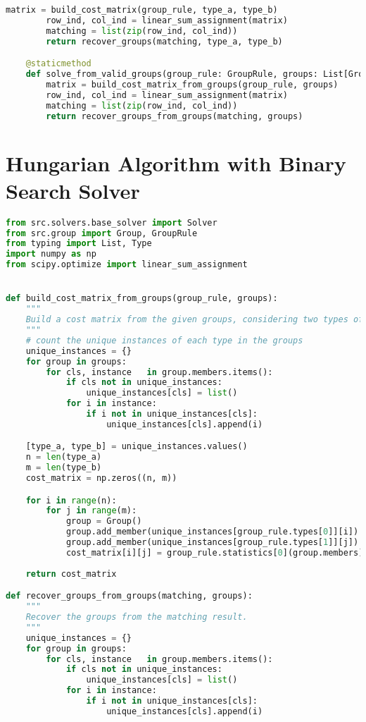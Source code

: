 \begin{apendicesenv}
\begin{lstlisting}[language=Python, caption={Hungarian Algorithm Solver Source Code}]
        matrix = build_cost_matrix(group_rule, type_a, type_b)
        row_ind, col_ind = linear_sum_assignment(matrix)
        matching = list(zip(row_ind, col_ind))
        return recover_groups(matching, type_a, type_b)

    @staticmethod
    def solve_from_valid_groups(group_rule: GroupRule, groups: List[Group]):
        matrix = build_cost_matrix_from_groups(group_rule, groups)
        row_ind, col_ind = linear_sum_assignment(matrix)
        matching = list(zip(row_ind, col_ind))
        return recover_groups_from_groups(matching, groups)
\end{lstlisting}

\chapter{Hungarian Algorithm with Binary Search Solver}
\label{app:solver_binary_search}
\begin{lstlisting}[language=Python, caption={Hungarian Algorithm with Binary Search Solver Source Code}]
from src.solvers.base_solver import Solver
from src.group import Group, GroupRule
from typing import List, Type
import numpy as np
from scipy.optimize import linear_sum_assignment


def build_cost_matrix_from_groups(group_rule, groups):
    """
    Build a cost matrix from the given groups, considering two types of objects.
    """
    # count the unique instances of each type in the groups
    unique_instances = {}
    for group in groups:
        for cls, instance   in group.members.items():
            if cls not in unique_instances:
                unique_instances[cls] = list()
            for i in instance:
                if i not in unique_instances[cls]:
                    unique_instances[cls].append(i)

    [type_a, type_b] = unique_instances.values()
    n = len(type_a)
    m = len(type_b)
    cost_matrix = np.zeros((n, m))

    for i in range(n):
        for j in range(m):
            group = Group()
            group.add_member(unique_instances[group_rule.types[0]][i])
            group.add_member(unique_instances[group_rule.types[1]][j])
            cost_matrix[i][j] = group_rule.statistics[0](group.members)
    
    return cost_matrix

def recover_groups_from_groups(matching, groups):
    """
    Recover the groups from the matching result.
    """
    unique_instances = {}
    for group in groups:
        for cls, instance   in group.members.items():
            if cls not in unique_instances:
                unique_instances[cls] = list()
            for i in instance:
                if i not in unique_instances[cls]:
                    unique_instances[cls].append(i)


\end{lstlisting}
\end{apendicesenv}
